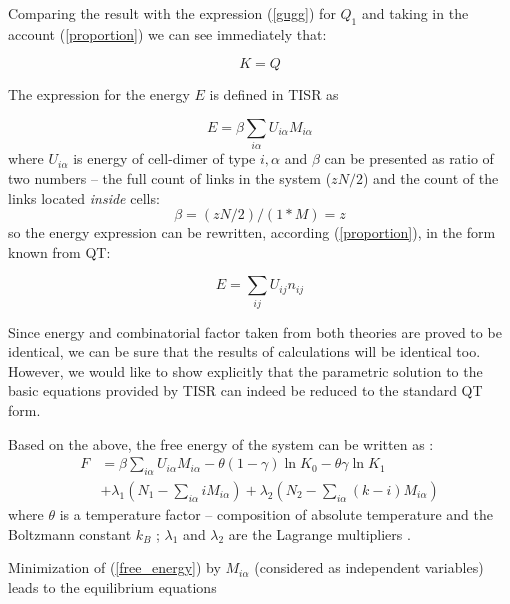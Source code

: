 \documentclass[12pt,abstract]{scrartcl}
\begin{document}
Comparing the result with the expression (\ref{gugg}) for $Q_1$ and taking in the account (\ref{proportion}) we can see immediately that:

\[
K = Q
\] 

The expression for the energy  $E$ is defined in TISR as


\begin{equation} \label{energy}
E = \beta\sum_{i\alpha} U_{i \alpha} M_{i \alpha}
\end{equation} 
where $U_{i \alpha}$ is energy of cell-dimer of type $i, \alpha$ and \(\beta\) can be presented as ratio of two  numbers -- the full count of links in the system  ($ z N/2 $) and the count of the links located \textit{inside} cells: 
\begin{equation}
\beta = (z N/2) / (1 * M) = z 
\end{equation}
so the energy expression can be rewritten, according (\ref{proportion}), in the form known from QT:

\begin{equation} \label{QT_energy}
E = \sum_{ij} U_{ij} n_{ij}
\end{equation} 

Since energy and combinatorial factor taken from both theories are proved to be identical, we can be sure that the results of calculations will be identical too. 
However, we would like  to show explicitly  that the parametric solution to the basic equations provided by TISR  can indeed be reduced to the standard QT form.


Based on the above, the free energy of the system can be written as  \cite{TISR_p1}:
\begin{equation} \label{free_energy}
\begin{split}
    F &= \beta\sum_{i\alpha} U_{i \alpha} M_{i \alpha} - \theta(1- \gamma) \ln K_0 - \theta \gamma \ln K_1\\ &+ \lambda_1 \left(N_1 - \sum_{i\alpha} i M_{i \alpha} 
    \right) + \lambda_2 \left(N_2 - \sum_{i\alpha} (k-i) M_{i \alpha} 
    \right)
\end{split}
\end{equation}
where  $\theta $ is a temperature factor --  composition of absolute temperature and the Boltzmann constant $k_B$  \cite{Hill1956}; $\lambda_1$ and  $\lambda_2$ are the Lagrange multipliers  \cite{Arfken2013}.



Minimization of (\ref{free_energy})  by $M_{i \alpha}$ (considered as independent variables) leads to the equilibrium equations 
\end{document}
